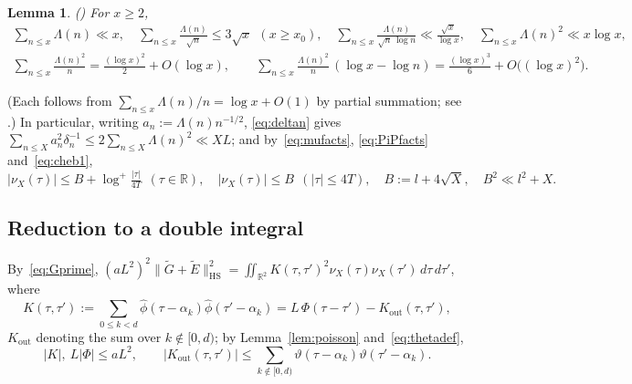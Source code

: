 \documentclass[11pt]{amsart}
\newtheorem{lemma}[theorem]{Lemma}
\theoremstyle{definition}
\theoremstyle{remark}
\numberwithin{equation}{section}
\newcommand{\RR}{\mathbb{R}}
\newcommand{\wh}{\widehat}
\newcommand{\Gt}{\widetilde{G}}
\newcommand{\Et}{\widetilde{E}}
\newcommand{\dd}{\,d}
\newcommand{\HS}{\mathrm{HS}}
\begin{document}
\begin{lemma}\label{lem:cheb}\textup{(\cite[\S2.2]{MV07})}
For $x\ge2$,
\begin{gather}
\sum_{n\le x}\Lambda(n)\ll x,\quad \sum_{n\le x}\frac{\Lambda(n)}{\sqrt n}\le 3\sqrt x\ \ (x\ge x_0),\quad \sum_{n\le x}\frac{\Lambda(n)}{\sqrt n\,\log n}\ll\frac{\sqrt x}{\log x},\quad \sum_{n\le x}\Lambda(n)^2\ll x\log x,\label{eq:cheb1}\\
\sum_{n\le x}\frac{\Lambda(n)^2}{n}=\frac{(\log x)^2}2+O(\log x),\qquad
\sum_{n\le x}\frac{\Lambda(n)^2}{n}\,(\log x-\log n)=\frac{(\log x)^3}{6}+O\bigl((\log x)^2\bigr).\label{eq:cheb2}
\end{gather}
\end{lemma}
\noindent(Each follows from $\sum_{n\le x}\Lambda(n)/n=\log x+O(1)$ by partial summation; see \cite[Theorem~2.7]{IK04}.) In particular, writing $a_n:=\Lambda(n)n^{-1/2}$, \eqref{eq:deltan} gives $\sum_{n\le X}a_n^2\delta_n^{-1}\le2\sum_{n\le X}\Lambda(n)^2\ll XL$; and by~\eqref{eq:mufacts}, \eqref{eq:PiPfacts} and~\eqref{eq:cheb1},
\begin{equation}\label{eq:Bdef}
|\nu_X(\tau)|\le B+\log^+\tfrac{|\tau|}{4T}\ \ (\tau\in\RR),\quad |\nu_X(\tau)|\le B\ \ (|\tau|\le4T),\quad B:=l+4\sqrt X,\quad B^2\ll l^2+X.
\end{equation}

\subsection{Reduction to a double integral}
By~\eqref{eq:Gprime}, $(aL^2)^2\|\Gt+\Et\|_{\HS}^2=\iint_{\RR^2}K(\tau,\tau')^2\nu_X(\tau)\nu_X(\tau')\dd\tau\dd\tau'$, where
\begin{equation}\label{eq:Kdef}
K(\tau,\tau'):=\sum_{0\le k<d}\wh\phi(\tau-\alpha_k)\wh\phi(\tau'-\alpha_k)=L\,\Phi(\tau-\tau')-K_{\mathrm{out}}(\tau,\tau'),
\end{equation}
$K_{\mathrm{out}}$ denoting the sum over $k\notin[0,d)$; by Lemma~\ref{lem:poisson} and~\eqref{eq:thetadef},
\begin{equation}\label{eq:Kbounds}
|K|,\ L|\Phi|\le aL^2,\qquad |K_{\mathrm{out}}(\tau,\tau')|\le\sum_{k\notin[0,d)}\vartheta(\tau-\alpha_k)\vartheta(\tau'-\alpha_k).
\end{equation}
\end{document}
